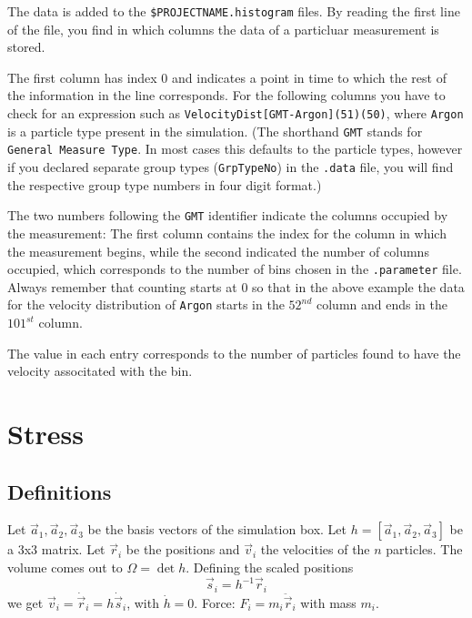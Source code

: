 The data is added to the {\tt\$PROJECTNAME.histogram} files. By reading the first line of the file, you find in which columns the data of a particluar measurement is stored. 

The first column has index 0 and indicates a point in time to which the rest of the information in the line corresponds. For the following columns you have to check for an expression such as {\tt VelocityDist[GMT-Argon](51)(50)}, where 
{\tt Argon} is a particle type present in the simulation. (The shorthand {\tt GMT} stands for {\tt General Measure Type}. In most cases this defaults to the particle types, however if you declared separate group types ({\tt GrpTypeNo}) in the {\tt .data} file, you will find the respective group type numbers in four digit format.)

The two numbers following the {\tt GMT} identifier indicate the columns occupied by the measurement: The first column contains the index for the column in which the measurement begins, while the second indicated the number of columns occupied, which corresponds to the number of bins chosen in the {\tt .parameter} file. Always remember that counting starts at 0 so that in the above example the data for the velocity distribution of {\tt Argon} starts in the $52^{nd}$ column and ends in the $101^{st}$ column.

The value in each entry corresponds to the number of particles found to have the velocity associtated with the bin.


\section{Stress}
\label{output:stress}
\subsection{Definitions}
Let \( \vec{a}_1, \vec{a}_2, \vec{a}_3 \) be the basis vectors of the simulation box. Let \( h = [\vec{a}_1, \vec{a}_2, \vec{a}_3] \) be a 3x3 matrix. Let \( \vec{r}_i \) be the positions and \( \vec{v}_i \) the velocities of the \( n \) particles. The volume comes out to \( \Omega = \det{h} \). Defining the scaled positions
\[ \vec{s}_i =  h^{-1}\vec{r}_i\]
we get
\( \vec{v}_i = \dot{\vec{r}}_i = h\dot{\vec{s}}_i \), with \( \dot{h} = 0 \). Force: \( F_i = m_i\ddot{\vec{r}}_i \) with mass \( m_i \).


